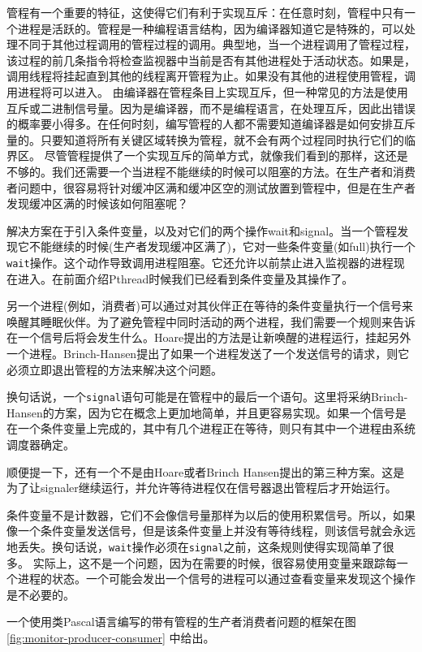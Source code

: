 	管程有一个重要的特征，这使得它们有利于实现互斥：在任意时刻，管程中只有一个进程是活跃的。管程是一种编程语言结构，因为编译器知道它是特殊的，可以处理不同于其他过程调用的管程过程的调用。典型地，当一个进程调用了管程过程，该过程的前几条指令将检查监视器中当前是否有其他进程处于活动状态。如果是，调用线程将挂起直到其他的线程离开管程为止。如果没有其他的进程使用管程，调用进程将可以进入。
	由编译器在管程条目上实现互斥，但一种常见的方法是使用互斥或二进制信号量。因为是编译器，而不是编程语言，在处理互斥，因此出错误的概率要小得多。在任何时刻，编写管程的人都不需要知道编译器是如何安排互斥量的。只要知道将所有关键区域转换为管程，就不会有两个过程同时执行它们的临界区。
	尽管管程提供了一个实现互斥的简单方式，就像我们看到的那样，这还是不够的。我们还需要一个当进程不能继续的时候可以阻塞的方法。在生产者和消费者问题中，很容易将针对缓冲区满和缓冲区空的测试放置到管程中，但是在生产者发现缓冲区满的时候该如何阻塞呢？
	
	解决方案在于引入条件变量，以及对它们的两个操作wait和signal。当一个管程发现它不能继续的时候(生产者发现缓冲区满了)，它对一些条件变量(如full)执行一个\texttt{wait}操作。这个动作导致调用进程阻塞。它还允许以前禁止进入监视器的进程现在进入。在前面介绍Pthread时候我们已经看到条件变量及其操作了。
	
	另一个进程(例如，消费者)可以通过对其伙伴正在等待的条件变量执行一个信号来唤醒其睡眠伙伴。为了避免管程中同时活动的两个进程，我们需要一个规则来告诉在一个信号后将会发生什么。Hoare提出的方法是让新唤醒的进程运行，挂起另外一个进程。Brinch-Hansen提出了如果一个进程发送了一个发送信号的请求，则它必须立即退出管程的方法来解决这个问题。
	
	换句话说，一个\texttt{signal}语句可能是在管程中的最后一个语句。这里将采纳Brinch-Hansen的方案，因为它在概念上更加地简单，并且更容易实现。如果一个信号是在一个条件变量上完成的，其中有几个进程正在等待，则只有其中一个进程由系统调度器确定。
	
	顺便提一下，还有一个不是由Hoare或者Brinch Hansen提出的第三种方案。这是为了让signaler继续运行，并允许等待进程仅在信号器退出管程后才开始运行。
	
	条件变量不是计数器，它们不会像信号量那样为以后的使用积累信号。所以，如果像一个条件变量发送信号，但是该条件变量上并没有等待线程，则该信号就会永远地丢失。换句话说，\texttt{wait}操作必须在\texttt{signal}之前，这条规则使得实现简单了很多。
	实际上，这不是一个问题，因为在需要的时候，很容易使用变量来跟踪每一个进程的状态。一个可能会发出一个信号的进程可以通过查看变量来发现这个操作是不必要的。
	
	一个使用类Pascal语言编写的带有管程的生产者消费者问题的框架在图 \ref{fig:monitor-producer-consumer} 中给出。
	
